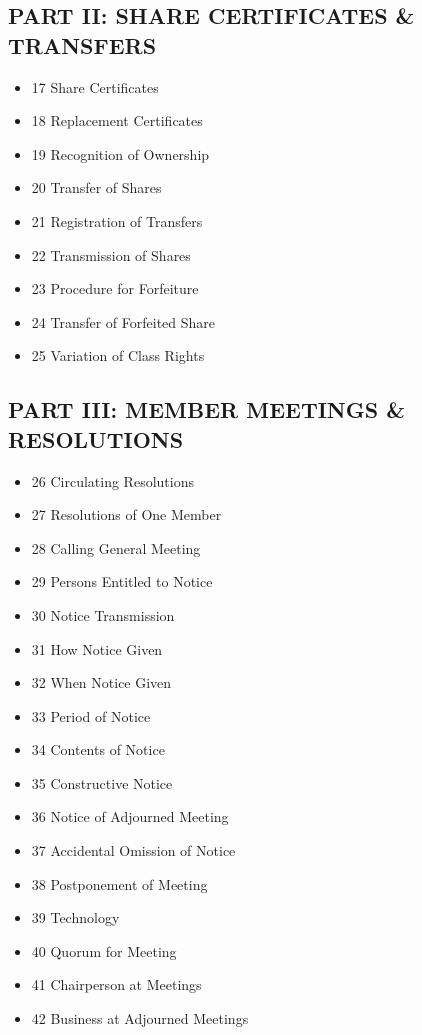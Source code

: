 \subsection*{PART II: SHARE CERTIFICATES \& TRANSFERS}
\begin{itemize}[leftmargin=1em]
    \item 17 Share Certificates
    \item 18 Replacement Certificates
    \item 19 Recognition of Ownership
    \item 20 Transfer of Shares
    \item 21 Registration of Transfers
    \item 22 Transmission of Shares
    \item 23 Procedure for Forfeiture
    \item 24 Transfer of Forfeited Share
    \item 25 Variation of Class Rights
\end{itemize}

\subsection*{PART III: MEMBER MEETINGS \& RESOLUTIONS}
\begin{itemize}[leftmargin=1em]
    \item 26 Circulating Resolutions
    \item 27 Resolutions of One Member
    \item 28 Calling General Meeting
    \item 29 Persons Entitled to Notice
    \item 30 Notice Transmission
    \item 31 How Notice Given
    \item 32 When Notice Given
    \item 33 Period of Notice
    \item 34 Contents of Notice
    \item 35 Constructive Notice
    \item 36 Notice of Adjourned Meeting
    \item 37 Accidental Omission of Notice
    \item 38 Postponement of Meeting
    \item 39 Technology
    \item 40 Quorum for Meeting
    \item 41 Chairperson at Meetings
    \item 42 Business at Adjourned Meetings
\end{itemize}

